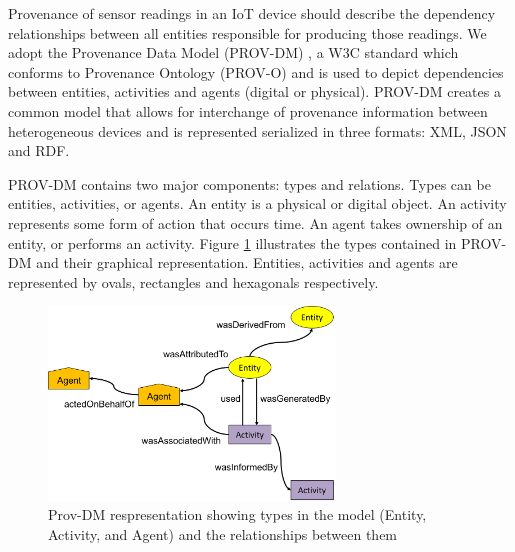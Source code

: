 \documentclass[conference]{IEEEtran}
\begin{document}

Provenance of sensor readings in an IoT device should describe the dependency relationships between all entities responsible for producing those readings. We adopt the Provenance Data Model (PROV-DM) \cite{prov_dm}, a W3C standard which conforms to Provenance Ontology (PROV-O) and is used to depict dependencies between entities, activities and agents (digital or physical). PROV-DM creates a common model that allows for interchange of provenance information between heterogeneous devices and is represented serialized in three formats:  XML, JSON and RDF. 

\par PROV-DM contains two major components: types and relations.  Types can be entities, activities, or agents. An entity is a physical or digital object. An activity represents some form of action that occurs time.  An agent takes ownership of an entity, or performs an activity. Figure \ref{prov_rep} illustrates the types contained in PROV-DM and their graphical representation. Entities, activities and agents are represented by ovals, rectangles and hexagonals respectively. 





\begin{figure}[h!]
\begin{center}

\includegraphics[width=3.0in]{prov_dm_2.PNG}
\end{center}
\caption{Prov-DM respresentation showing types in the model (Entity, Activity, and Agent) and the relationships between them }
\label{prov_rep}
\end{figure}
\end{document}
